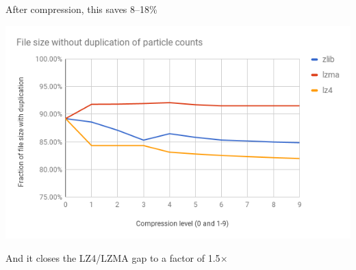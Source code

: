 \documentclass[aspectratio=169]{beamer}
\begin{document}
\begin{frame}{After compression, this saves 8--18\%}
\vspace{0.1 cm}
\begin{center}
\includegraphics[width=0.9\linewidth]{avoiding-duplication.png}
\end{center}
\end{frame}

\begin{frame}{And it closes the LZ4/LZMA gap to a factor of 1.5$\times$}
\vspace{0.1 cm}
\begin{center}
\end{center}
\end{frame}
\end{document}
